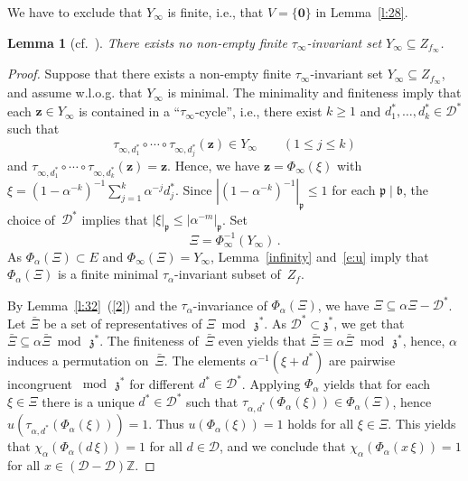 \documentclass[12pt]{amsart}
\newtheorem{lemma}{Lemma}[section]
\theoremstyle{definition}
\theoremstyle{remark}
\numberwithin{equation}{section}
\begin{document}
We have to exclude that $Y_\infty$ is finite, i.e., that $V = \{\mathbf{0}\}$ in Lemma~\ref{l:28}.

\begin{lemma}[{cf.\ \cite[Lemma~3.3]{Lagarias-Wang:97}}] \label{l:33}
There exists no non-empty finite $\tau_\infty$-invariant set $Y_\infty \subseteq Z_{f_\infty}$.
\end{lemma}

\begin{proof}
Suppose that there exists a non-empty finite $\tau_\infty$-invariant set $Y_\infty \subseteq Z_{f_\infty}$, and assume w.l.o.g. that $Y_\infty$ is minimal.
The minimality and finiteness imply that each $\mathbf{z} \in Y_\infty$ is contained in a ``$\tau_\infty$-cycle'', i.e., there exist $k \ge 1$ and $d_1^*,\ldots,d_k^* \in \mathcal{D}^*$ such that
\[
\tau_{\infty,d_1^*} \circ\cdots\circ \tau_{\infty,d_j^*}(\mathbf{z}) \in Y_\infty \qquad (1 \le j \le k)
\]
and $\tau_{\infty,d_1^*} \circ\cdots\circ \tau_{\infty,d_k^*}(\mathbf{z})=\mathbf{z}$.
Hence, we have $\mathbf{z} = \Phi_\infty(\xi)$ with $\xi = (1-\alpha^{-k})^{-1} \sum_{j=1}^k \alpha^{-j}  d_j^*$.
Since $|(1-\alpha^{-k})^{-1}|_\mathfrak{p} \le 1$ for each $\mathfrak{p}\mid\mathfrak{b}$, the choice of~$\mathcal{D}^*$ implies that $|\xi|_\mathfrak{p} \le |\alpha^{-m}|_\mathfrak{p}$.
Set
\[
\Xi = \Phi_\infty^{-1}(Y_\infty)\,.
\]
As $\Phi_\alpha(\Xi) \subset E$ and $\Phi_\infty(\Xi) = Y_\infty$, Lemma~\ref{infinity} and~\eqref{e:u} imply that $\Phi_\alpha(\Xi)$ is a finite minimal $\tau_\alpha$-invariant subset of~$Z_f$.

By Lemma~\ref{l:32}~(\ref{2}) and  the $\tau_\alpha$-invariance of $\Phi_\alpha(\Xi)$, we have $\Xi \subseteq \alpha \Xi - \mathcal{D}^*$.
Let $\bar{\Xi}$ be a set of representatives of $\Xi \bmod\, \mathfrak{z}^*$.
As $\mathcal{D}^* \subset \mathfrak{z}^*$, we get that $\bar{\Xi} \subseteq \alpha \bar{\Xi} \bmod\, \mathfrak{z}^*$.
The finiteness of~$\bar{\Xi}$ even yields that $\bar{\Xi} \equiv \alpha \bar{\Xi} \bmod\, \mathfrak{z}^*$, hence, $\alpha$ induces a permutation on~$\bar{\Xi}$.
The elements $\alpha^{-1} (\xi + d^*)$ are pairwise incongruent $\bmod\, \mathfrak{z}^*$ for different $d^*\in\mathcal{D}^*$.
Applying $\Phi_\alpha$ yields that for each $\xi \in \Xi$ there is a unique $d^* \in \mathcal{D}^*$ such that $\tau_{\alpha,d^*}(\Phi_\alpha(\xi)) \in \Phi_\alpha(\Xi)$, hence $u(\tau_{\alpha,d^*}(\Phi_\alpha(\xi))) = 1$.
Thus $u(\Phi_\alpha(\xi)) = 1$ holds for all $\xi \in \Xi$.
This yields that $\chi_\alpha(\Phi_\alpha(d\, \xi)) = 1$ for all $d \in \mathcal{D}$, and we conclude that $\chi_\alpha(\Phi_\alpha(x\, \xi)) = 1$ for all $x \in (\mathcal{D} - \mathcal{D}) \mathbb{Z}$.


\end{proof}
\end{document}
